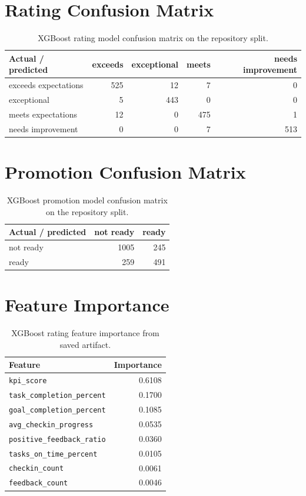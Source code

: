 \section{Rating Confusion Matrix}
\begin{table}[H]\centering\scriptsize
\caption{XGBoost rating model confusion matrix on the repository split.}
\label{tab:rating-confusion}
\begin{tabular}{lrrrr}
\toprule
Actual / predicted & exceeds & exceptional & meets & needs improvement\\
\midrule
exceeds expectations & 525 & 12 & 7 & 0\\
exceptional & 5 & 443 & 0 & 0\\
meets expectations & 12 & 0 & 475 & 1\\
needs improvement & 0 & 0 & 7 & 513\\
\bottomrule
\end{tabular}
\end{table}

\section{Promotion Confusion Matrix}
\begin{table}[H]\centering\small
\caption{XGBoost promotion model confusion matrix on the repository split.}
\label{tab:promotion-confusion}
\begin{tabular}{lrr}
\toprule
Actual / predicted & not ready & ready\\
\midrule
not ready & 1005 & 245\\
ready & 259 & 491\\
\bottomrule
\end{tabular}
\end{table}

\section{Feature Importance}
\begin{table}[H]\centering\small
\caption{XGBoost rating feature importance from saved artifact.}
\label{tab:rating-feature-importance}
\begin{tabular}{lr}
\toprule
Feature & Importance\\
\midrule
\texttt{kpi\_score} & 0.6108\\
\texttt{task\_completion\_percent} & 0.1700\\
\texttt{goal\_completion\_percent} & 0.1085\\
\texttt{avg\_checkin\_progress} & 0.0535\\
\texttt{positive\_feedback\_ratio} & 0.0360\\
\texttt{tasks\_on\_time\_percent} & 0.0105\\
\texttt{checkin\_count} & 0.0061\\
\texttt{feedback\_count} & 0.0046\\
\bottomrule
\end{tabular}
\end{table}


